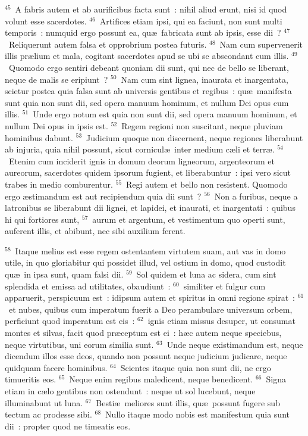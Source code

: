 ${}^{45}$~A fabris autem et ab aurificibus facta sunt~: nihil aliud erunt, nisi id quod volunt esse sacerdotes.
${}^{46}$~Artifices etiam ipsi, qui ea faciunt, non sunt multi temporis~: numquid ergo possunt ea, qu\ae\ fabricata sunt ab ipsis, esse dii~?
${}^{47}$~Reliquerunt autem falsa et opprobrium postea futuris.
${}^{48}$~Nam cum supervenerit illis pr\ae lium et mala, cogitant sacerdotes apud se ubi se abscondant cum illis.
${}^{49}$~Quomodo ergo sentiri debeant quoniam dii sunt, qui nec de bello se liberant, neque de malis se eripiunt~?
${}^{50}$~Nam cum sint lignea, inaurata et inargentata, scietur postea quia falsa sunt ab universis gentibus et regibus~: qu\ae\ manifesta sunt quia non sunt dii, sed opera manuum hominum, et nullum Dei opus cum illis.
${}^{51}$~Unde ergo notum est quia non sunt dii, sed opera manuum hominum, et nullum Dei opus in ipsis est.
${}^{52}$~Regem regioni non suscitant, neque pluviam hominibus dabunt.
${}^{53}$~Judicium quoque non discernent, neque regiones liberabunt ab injuria, quia nihil possunt, sicut cornicul\ae\ inter medium c\ae li et terr\ae .
${}^{54}$~Etenim cum inciderit ignis in domum deorum ligneorum, argenteorum et aureorum, sacerdotes quidem ipsorum fugient, et liberabuntur~: ipsi vero sicut trabes in medio comburentur.
${}^{55}$~Regi autem et bello non resistent. Quomodo ergo \ae stimandum est aut recipiendum quia dii sunt~?
${}^{56}$~Non a furibus, neque a latronibus se liberabunt dii lignei, et lapidei, et inaurati, et inargentati~: quibus hi qui fortiores sunt,
${}^{57}$~aurum et argentum, et vestimentum quo operti sunt, auferent illis, et abibunt, nec sibi auxilium ferent.


${}^{58}$~Itaque melius est esse regem ostentantem virtutem suam, aut vas in domo utile, in quo gloriabitur qui possidet illud, vel ostium in domo, quod custodit qu\ae\ in ipsa sunt, quam falsi dii.
${}^{59}$~Sol quidem et luna ac sidera, cum sint splendida et emissa ad utilitates, obaudiunt~:
${}^{60}$~similiter et fulgur cum apparuerit, perspicuum est~: idipsum autem et spiritus in omni regione spirat~:
${}^{61}$~et nubes, quibus cum imperatum fuerit a Deo perambulare universum orbem, perficiunt quod imperatum est eis~:
${}^{62}$~ignis etiam missus desuper, ut consumat montes et silvas, facit quod pr\ae ceptum est ei~: h\ae c autem neque speciebus, neque virtutibus, uni eorum similia sunt.
${}^{63}$~Unde neque existimandum est, neque dicendum illos esse deos, quando non possunt neque judicium judicare, neque quidquam facere hominibus.
${}^{64}$~Scientes itaque quia non sunt dii, ne ergo timueritis eos.
${}^{65}$~Neque enim regibus maledicent, neque benedicent.
${}^{66}$~Signa etiam in c\ae lo gentibus non ostendunt~: neque ut sol lucebunt, neque illuminabunt ut luna.
${}^{67}$~Besti\ae\ meliores sunt illis, qu\ae\ possunt fugere sub tectum ac prodesse sibi.
${}^{68}$~Nullo itaque modo nobis est manifestum quia sunt dii~: propter quod ne timeatis eos.


